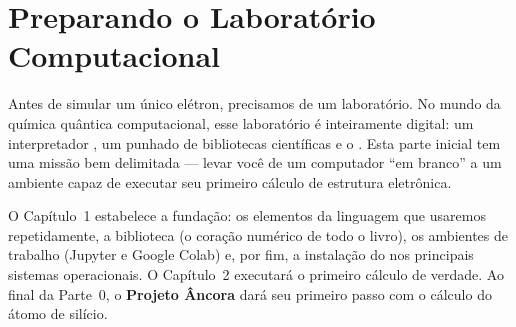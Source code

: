 \setcounter{part}{-1}
\part{Preparando o Laboratório Computacional}

\noindent
Antes de simular um único elétron, precisamos de um laboratório. No mundo da
química quântica computacional, esse laboratório é inteiramente digital: um
interpretador \python{}, um punhado de bibliotecas científicas e o \pyscf{}. Esta
parte inicial tem uma missão bem delimitada --- levar você de um computador
``em branco'' a um ambiente capaz de executar seu primeiro cálculo de estrutura
eletrônica.

\vspace{0.3cm}
\noindent
O Capítulo~1 estabelece a fundação: os elementos da linguagem \python{} que
usaremos repetidamente, a biblioteca \numpy{} (o coração numérico de todo o
livro), os ambientes de trabalho (Jupyter e Google Colab) e, por fim, a
instalação do \pyscf{} nos principais sistemas operacionais. O Capítulo~2
executará o primeiro cálculo de verdade. Ao final da Parte~0, o
\textbf{Projeto Âncora} dará seu primeiro passo com o cálculo do átomo de
silício.
